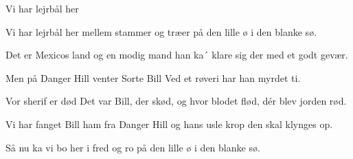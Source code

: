 \begin{sang}{Vi har lejrbål her}{}
\begin{vers}
Vi har lejrbål her
mellem stammer og træer
på den lille ø
i den blanke sø.
\end{vers}
\begin{vers}
Det er Mexicos land
og en modig mand
han ka´ klare sig der
med et godt gevær.
\end{vers}
\begin{vers}
Men på Danger Hill
venter Sorte Bill
Ved et røveri
har han myrdet ti.
\end{vers}
\vbox{}\vfill
\begin{vers}
Vor sherif er død
Det var Bill, der skød,
og hvor blodet flød,
dér blev jorden rød.
\end{vers}
\begin{vers}
Vi har fanget Bill
ham fra Danger Hill
og hans usle krop
den skal klynges op.
\end{vers}
\begin{vers}
Så nu ka vi bo
her i fred og ro
på den lille ø
i den blanke sø.
\end{vers}
\laps
\end{sang}
